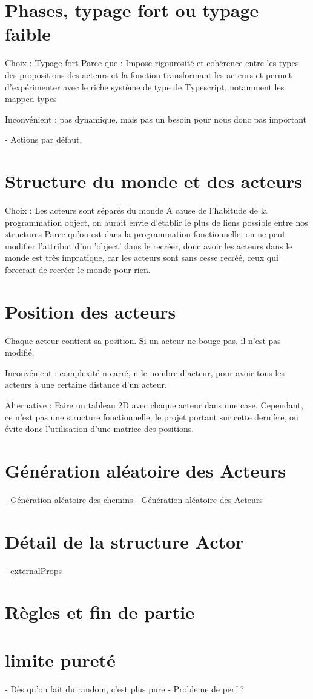 \documentclass{article}
\begin{document}
\section{Phases, typage fort ou typage faible}
Choix : Typage fort
Parce que : Impose rigourosité et cohérence entre les types des propositions des 
acteurs et la fonction transformant les acteurs et permet d'expérimenter avec 
le riche système de type de Typescript, notamment les mapped types

Inconvénient : pas dynamique, mais pas un besoin pour nous donc pas important

- Actions par défaut.

\section{Structure du monde et des acteurs}
Choix : Les acteurs sont séparés du monde
A cause de l'habitude de la programmation object, on aurait envie d'établir le plus de liens possible entre nos structures
Parce qu'on est dans la programmation fonctionnelle, on ne peut modifier l'attribut d'un 'object' dans le recréer, 
donc avoir les acteurs dans le monde est très impratique, car les acteurs sont sans cesse recréé, ceux qui forcerait de 
recréer le monde pour rien.

\section{Position des acteurs}
Chaque acteur contient sa position.
Si un acteur ne bouge pas, il n'est pas modifié.

Inconvénient : complexité n carré, n le nombre d'acteur, pour avoir tous les acteurs à une certaine distance d'un acteur.

Alternative : Faire un tableau 2D avec chaque acteur dans une case. Cependant, ce n'est pas une structure fonctionnelle, 
le projet portant sur cette dernière, on évite donc l'utilisation d'une matrice des positions.

\section{Génération aléatoire des Acteurs}
- Génération aléatoire des chemins
- Génération aléatoire des Acteurs

\section{Détail de la structure Actor}
- externalProps

\section{Règles et fin de partie}

\section{limite pureté}
- Dès qu'on fait du random, c'est plus pure
- Probleme de perf ?
\end{document}
